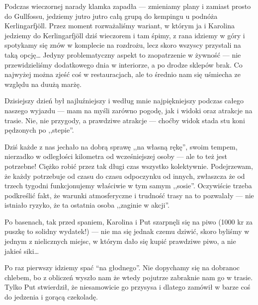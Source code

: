 Podczas wieczornej narady klamka zapadła --- zmieniamy plany i zamiast prosto do Gullfossu, jedziemy jutro jutro całą grupą do kempingu u podnóża Kerlingarfjöll. Przez moment rozważaliśmy wariant, w którym ja i Karolina jedziemy do Kerlingarfjöll dziś wieczorem i tam śpimy, z rana idziemy w góry i spotykamy się znów w komplecie na rozdrożu, lecz skoro wszyscy przystali na taką opcję… Jedyny problematyczny aspekt to zaopatrzenie w żywność --- nie przewidzieliśmy dodatkowego dnia w interiorze, a po drodze sklepów brak. Co najwyżej można zjeść coś w restauracjach, ale to średnio nam się uśmiecha ze względu na duużą marżę.

Dzisiejszy dzień był najluźniejszy i według mnie najpiękniejszy podczas całego naszego wyjazdu --- mam na myśli zarówno pogodę, jak i widoki oraz atrakcje na trasie. Nie, nie przygody, a prawdziwe atrakcje --- choćby widok stada stu koni pędzonych po ,,stepie''.

Dziś każde z nas jechało na dobrą sprawę ,,na własną rękę'', swoim tempem, nierzadko w odległości kilometra od wcześniejszej osoby --- ale to też jest potrzebne! Ciężko robić przez tak długi czas wszystko kolektywnie. Podejrzewam, że każdy potrzebuje od czasu do czasu odpoczynku od innych, zwłaszcza że od trzech tygodni funkcjonujemy właściwie w tym samym ,,sosie''. Oczywiście trzeba podkreślić fakt, że warunki atmosferyczne i trudność trasy na to pozwalały --- nie istniało ryzyko, że ta ostatnia osoba ,,zaginie w akcji''.

Po basenach, tak przed spaniem, Karolina i Put szarpnęli się na piwo (1000 kr za puszkę to solidny wydatek!) --- nie ma się jednak czemu dziwić, skoro byliśmy w jednym z nielicznych miejsc, w którym dało się kupić prawdziwe piwo, a nie jakieś siki…

Po raz pierwszy idziemy spać “na głodnego”. Nie dopychamy się na dobranoc chlebem, bo z obliczeń wyszło nam że wtedy pojutrze zabraknie nam go w trasie. Tylko Put stwierdził, że niesamowicie go przysysa i dlatego zamówił w barze coś do jedzenia i gorącą czekoladę.

